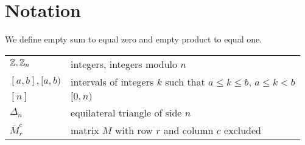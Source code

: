 \chapter*{Notation}

\bigskip

We define empty sum to equal zero and empty product to equal one.
\bigskip

\noindent
 \begin{tabularx}{\linewidth}{l X}
 $\mathbb Z, \mathbb Z_n$ & integers, integers modulo $n$ \\
 $[a,b], [a,b)$ & intervals of integers $k$ such that $a \leq k \leq b$, $a \leq k < b$ \\
 $[n]$ & $[0,n)$ \\
 $\Delta_n$ & equilateral triangle of side $n$ \\
 $\overbar{M}_r^c$ & matrix $M$ with row $r$ and column $c$ excluded \\
 \end{tabularx}
